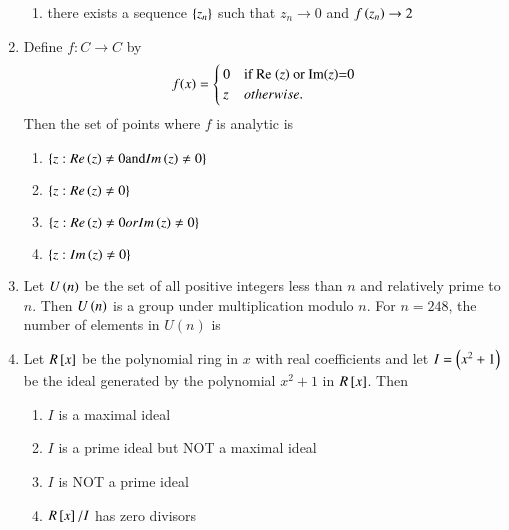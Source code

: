 \documentclass[journal]{IEEEtran}
\begin{document}
\begin{enumerate}
\begin{enumerate}
			\item there exists a sequence $\left\{z_{n}\right\}$ such that $z_{n} \rightarrow 0$ and $f\left(z_{n}\right) \rightarrow 2$
		\end{enumerate}
	\item Define $f: C \rightarrow C$ by 
         \begin{align*}
               f(x) = 
\begin{cases} 
    0 & \text{if Re \ensuremath{\left(z\right)} or Im\ensuremath{\left(z\right)}=0} \\
    z & otherwise.
\end{cases}
         \end{align*}
 Then the set of points where $f$ is analytic is
		\begin{enumerate}
			\item $\left\{z: Re \left(z\right) \neq 0 \text{and} Im \left(z\right) \neq 0\right\}$
			\item $\left\{z: Re\left(z\right) \neq 0\right\}$
			\item $\left\{z: Re \left(z\right) \neq 0 or Im \left(z\right) \neq 0\right\}$
	        \item $\left\{z: Im \left(z\right) \neq 0\right\}$
        	\end{enumerate}
	\item Let $U\left(n\right)$ be the set of all positive integers less than $n$ and relatively prime to $n$. Then $U\left(n\right)$ is a group under multiplication modulo $n$. For $n=248$, the number of elements in $U(n)$ is
		\begin{enumerate}
        	\end{enumerate}	
	\item Let $ R {}\left[x\right]$ be the polynomial ring in $x$ with real coefficients and let $I=\left( x^{2}+1\right)$ be the ideal generated by the polynomial $x^{2}+1$ in $R{}\left[x\right]$. Then
		\begin{enumerate}
			\item $I$ is a maximal ideal
			\item $I$ is a prime ideal but NOT a maximal ideal
			\item $I$ is NOT a prime ideal
			\item $R{}\left[x\right] / I$ has zero divisors
        	\end{enumerate}

\end{enumerate}
\end{document}
